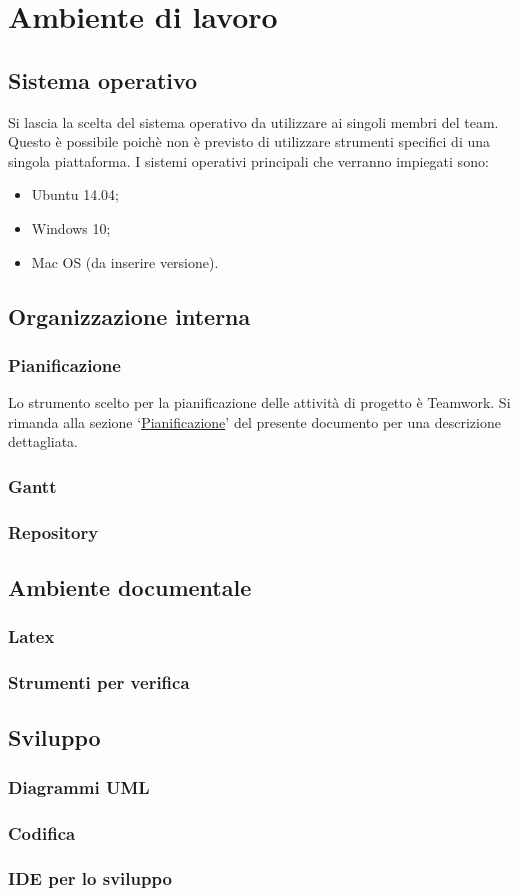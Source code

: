 \documentclass[../NormeProgetto.tex]{subfiles}
\begin{document}
	\section{Ambiente di lavoro}
		\subsection{Sistema operativo}
		Si lascia la scelta del sistema operativo da utilizzare ai singoli membri del team. Questo è possibile poichè non è previsto di utilizzare strumenti specifici di una singola piattaforma. I sistemi operativi principali che verranno impiegati sono:
		\begin{itemize}
			\item Ubuntu 14.04;
			\item Windows 10;
			\item Mac OS (da inserire versione).
		\end{itemize}
		
		\subsection{Organizzazione interna}
			\subsubsection{Pianificazione}
			Lo strumento scelto per la pianificazione delle attività di progetto è Teamwork. Si rimanda alla sezione `\hyperref[sec: Pianificazione Teamwork]{Pianificazione}' del presente documento per una descrizione dettagliata.
			\subsubsection{Gantt}
			\subsubsection{Repository}
		\subsection{Ambiente documentale}
			\subsubsection{Latex}
			\subsubsection{Strumenti per verifica}
		\subsection{Sviluppo}
			\subsubsection{Diagrammi UML}
		\subsubsection{Codifica}
			\subsubsection{IDE per lo sviluppo}
\end{document}
